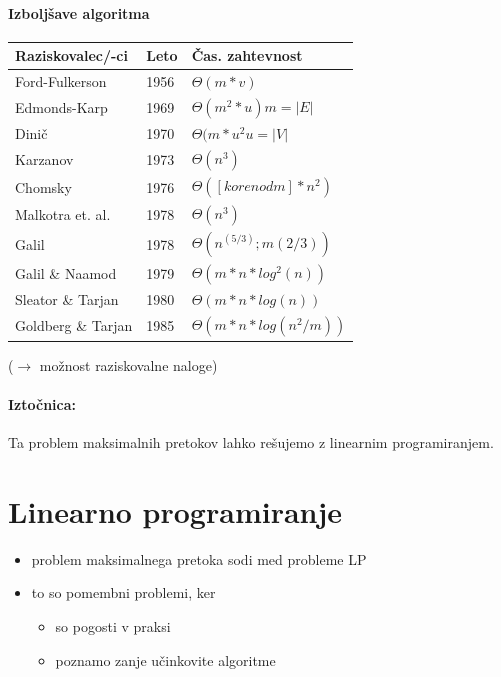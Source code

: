 \documentclass[a4paper,10pt]{article}
\begin{document}
\paragraph{Izbolj\v save algoritma}
\begin{center}
\begin{tabular}{|l|l|l|}\hline
\textbf{Raziskovalec/-ci} &	\textbf{Leto} &	\textbf{\v Cas. zahtevnost}\\\hline
Ford-Fulkerson &	1956 &	$\Theta(m*v)$\\
Edmonds-Karp &		1969 &	$\Theta(m^2*u)	m=|E|$\\
Dini\v c &		1970 &	$\Theta(m*u^2	u=|V|$\\
Karzanov &		1973 &	$\Theta(n^3)$\\
Chomsky &		1976 &	$\Theta([koren od m]*n^2)$\\
Malkotra et. al. &	1978 &	$\Theta(n^3)$\\
Galil &			1978 &	$\Theta(n^(5/3);m(2/3))$\\
Galil \& Naamod	&	1979 &	$\Theta(m*n*log^2(n))$\\
Sleator \& Tarjan &	1980 &	$\Theta(m*n*log(n))$\\
Goldberg \& Tarjan &	1985 &	$\Theta(m*n*log(n^2/m))$\\\hline
\end{tabular} 
($\rightarrow$ mo\v znost raziskovalne naloge)
\end{center}	

\paragraph{Izto\v cnica:}
Ta problem maksimalnih pretokov lahko re\v sujemo z linearnim programiranjem.

\section{Linearno programiranje}

\begin{itemize}
\item  problem maksimalnega pretoka sodi med probleme LP
\item to so pomembni problemi, ker
	\begin{itemize}
	\item so pogosti v praksi
	\item poznamo zanje u\v cinkovite algoritme
	\end{itemize}
\end{itemize}
\end{document}
